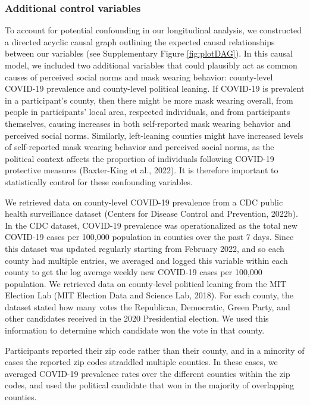 \documentclass[
  english,
  man,floatsintext]{apa6}
\begin{document}
\hypertarget{additional-control-variables}{%
\subsubsection{Additional control variables}\label{additional-control-variables}}

To account for potential confounding in our longitudinal analysis, we constructed a directed acyclic causal graph outlining the expected causal relationships between our variables (see Supplementary Figure \ref{fig:plotDAG}). In this causal model, we included two additional variables that could plausibly act as common causes of perceived social norms and mask wearing behavior: county-level COVID-19 prevalence and county-level political leaning. If COVID-19 is prevalent in a participant's county, then there might be more mask wearing overall, from people in participants' local area, respected individuals, and from participants themselves, causing increases in both self-reported mask wearing behavior and perceived social norms. Similarly, left-leaning counties might have increased levels of self-reported mask wearing behavior and perceived social norms, as the political context affects the proportion of individuals following COVID-19 protective measures (Baxter-King et al., 2022). It is therefore important to statistically control for these confounding variables.

We retrieved data on county-level COVID-19 prevalence from a CDC public health surveillance dataset (Centers for Disease Control and Prevention, 2022b). In the CDC dataset, COVID-19 prevalence was operationalized as the total new COVID-19 cases per 100,000 population in counties over the past 7 days. Since this dataset was updated regularly starting from February 2022, and so each county had multiple entries, we averaged and logged this variable within each county to get the log average weekly new COVID-19 cases per 100,000 population. We retrieved data on county-level political leaning from the MIT Election Lab (MIT Election Data and Science Lab, 2018). For each county, the dataset stated how many votes the Republican, Democratic, Green Party, and other candidates received in the 2020 Presidential election. We used this information to determine which candidate won the vote in that county.

Participants reported their zip code rather than their county, and in a minority of cases the reported zip codes straddled multiple counties. In these cases, we averaged COVID-19 prevalence rates over the different counties within the zip codes, and used the political candidate that won in the majority of overlapping counties.
\end{document}
